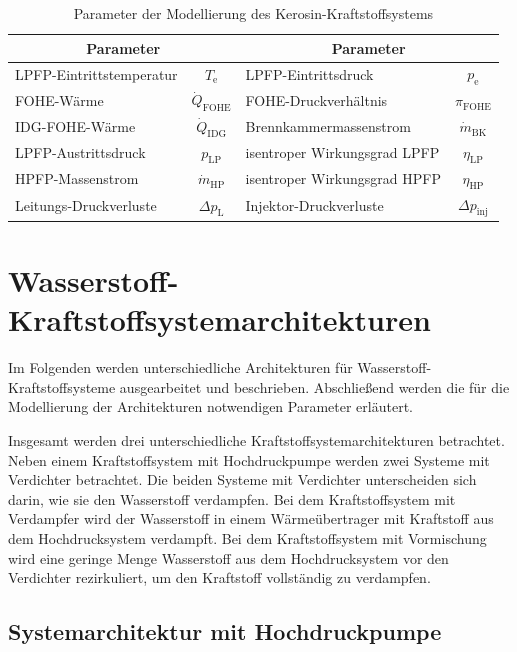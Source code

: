 \begin{table}[ht]
    \centering
	\caption{Parameter der Modellierung des Kerosin-Kraftstoffsystems}
	\begin{tabular} {|l|c|l|c|} \hline%
		\multicolumn{2}{|c|}{Parameter} & \multicolumn{2}{c|}{Parameter} \\ \hline\hline
        LPFP-Eintrittstemperatur & $T_\mathrm{e}$ & LPFP-Eintrittsdruck & $p_\mathrm{e}$ \\ \hline
        FOHE-Wärme & $\dot{Q}_{\mathrm{FOHE}}$ & FOHE-Druckverhältnis & $\pi_{\mathrm{FOHE}}$ \\ \hline   
        IDG-FOHE-Wärme  & $\dot{Q}_{\mathrm{IDG}}$ &  Brennkammermassenstrom & $\dot{m}_\mathrm{BK}$ \\ \hline
        LPFP-Austrittsdruck & $p_{\mathrm{LP}}$ & isentroper Wirkungsgrad LPFP & $\eta_{\mathrm{LP}}$ \\ \hline  
        HPFP-Massenstrom & $\dot{m}_{\mathrm{HP}}$ & isentroper Wirkungsgrad HPFP & $\eta_{\mathrm{HP}}$ \\ \hline
        Leitungs-Druckverluste & $\Delta p_{\mathrm{L}}$& Injektor-Druckverluste & $\Delta p_{\mathrm{inj}}$ \\ \hline
	\end{tabular}	
    \label{Tab:referenz_params}%
\end{table}
\FloatBarrier 

\section{Wasserstoff-Kraftstoffsystemarchitekturen}

Im Folgenden werden unterschiedliche Architekturen für Wasserstoff-Kraftstoffsysteme ausgearbeitet und beschrieben. Abschließend werden die für die Modellierung der Architekturen notwendigen Parameter erläutert. 

Insgesamt werden drei unterschiedliche Kraftstoffsystemarchitekturen betrachtet. Neben einem Kraftstoffsystem mit Hochdruckpumpe werden zwei Systeme mit Verdichter betrachtet. Die beiden Systeme mit Verdichter unterscheiden sich darin, wie sie den Wasserstoff verdampfen. Bei dem Kraftstoffsystem mit Verdampfer wird der Wasserstoff in einem Wärmeübertrager mit Kraftstoff aus dem Hochdrucksystem verdampft. Bei dem Kraftstoffsystem mit Vormischung wird eine geringe Menge Wasserstoff aus dem Hochdrucksystem vor den Verdichter rezirkuliert, um den Kraftstoff vollständig zu verdampfen.

\subsection{Systemarchitektur mit Hochdruckpumpe}

